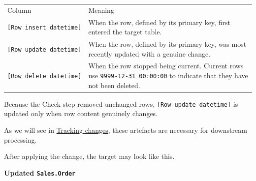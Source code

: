 \documentclass[10pt,openany,10pt]{book}
\newcounter{none}
\let\podeToprule\toprule
\let\podeMidrule\midrule
\let\podeBottomrule\bottomrule
\renewcommand{\toprule}{\arrayrulecolor{pbiGrid}\podeToprule}
\renewcommand{\midrule}{\arrayrulecolor{pbiGrid}\podeMidrule}
\renewcommand{\bottomrule}{\arrayrulecolor{pbiGrid}\podeBottomrule}
\begin{document}
{\def\LTcaptype{none} %
\begin{longtable}[]{@{}
  >{\raggedright\arraybackslash}p{}
  >{\raggedright\arraybackslash}p{}@{}}
\toprule\noalign{}
\begin{minipage}[b]{\linewidth}\raggedright
Column
\end{minipage} & \begin{minipage}[b]{\linewidth}\raggedright
Meaning
\end{minipage} \\
\midrule\noalign{}
\endhead
\bottomrule\noalign{}
\endlastfoot
\texttt{{[}Row\ insert\ datetime{]}} & When the row, defined by its
primary key, first entered the target table. \\
\texttt{{[}Row\ update\ datetime{]}} & When the row, defined by its
primary key, was most recently updated with a genuine change. \\
\texttt{{[}Row\ delete\ datetime{]}} & When the row stopped being
current. Current rows use \texttt{9999-12-31\ 00:00:00} to indicate that
they have not been deleted. \\
\end{longtable}
}

Because the Check step removed unchanged rows,
\texttt{{[}Row\ update\ datetime{]}} is updated only when row content
genuinely changes.

As we will see in
\hyperref[docs-efficient-stable-pipeline-tracking-changes]{Tracking
changes}, these artefacts are necessary for downstream processing.

After applying the change, the target may look like this.

\textbf{Updated \texttt{Sales.Order}}
\end{document}
